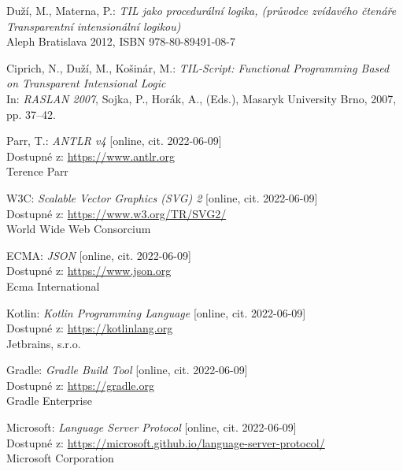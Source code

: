 \documentclass{article}
\begin{document}
\begin{thebibliography}{50}

Duží, M., Materna, P.: \textit{TIL jako procedurální logika, (průvodce zvídavého čtenáře Transparentní intensionální logikou)} \\
Aleph Bratislava 2012, ISBN 978-80-89491-08-7

Ciprich, N., Duží, M., Košinár, M.: \textit{TIL-Script: Functional Programming Based on
Transparent Intensional Logic} \\
In: \textit{RASLAN 2007}, Sojka, P., Horák, A., (Eds.), Masaryk University Brno, 2007, pp. 37–42.

Parr, T.: \textit{ANTLR v4} [online, cit. 2022-06-09] \\
Dostupné z: \url{https://www.antlr.org} \\
Terence Parr

W3C: \textit{Scalable Vector Graphics (SVG) 2} [online, cit. 2022-06-09] \\
Dostupné z: \url{https://www.w3.org/TR/SVG2/} \\
World Wide Web Consorcium

ECMA: \textit{JSON} [online, cit. 2022-06-09] \\
Dostupné z: \url{https://www.json.org} \\
Ecma International

Kotlin: \textit{Kotlin Programming Language} [online, cit. 2022-06-09] \\
Dostupné z: \url{https://kotlinlang.org} \\
Jetbrains, s.r.o.

Gradle: \textit{Gradle Build Tool} [online, cit. 2022-06-09] \\
Dostupné z: \url{https://gradle.org} \\
Gradle Enterprise

Microsoft: \textit{Language Server Protocol} [online, cit. 2022-06-09] \\
Dostupné z: \url{https://microsoft.github.io/language-server-protocol/} \\
Microsoft Corporation

\end{thebibliography}
\end{document}
